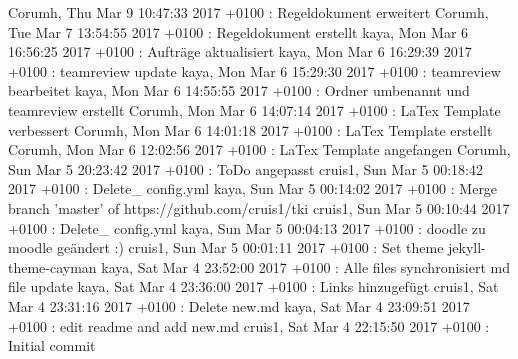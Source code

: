 Corumh, Thu Mar 9 10:47:33 2017 +0100 : Regeldokument erweitert
Corumh, Tue Mar 7 13:54:55 2017 +0100 : Regeldokument erstellt
kaya, Mon Mar 6 16:56:25 2017 +0100 : Aufträge aktualisiert
kaya, Mon Mar 6 16:29:39 2017 +0100 : teamreview update
kaya, Mon Mar 6 15:29:30 2017 +0100 : teamreview bearbeitet
kaya, Mon Mar 6 14:55:55 2017 +0100 : Ordner umbenannt und teamreview erstellt
Corumh, Mon Mar 6 14:07:14 2017 +0100 : LaTex Template verbessert
Corumh, Mon Mar 6 14:01:18 2017 +0100 : LaTex Template erstellt
Corumh, Mon Mar 6 12:02:56 2017 +0100 : LaTex Template angefangen
Corumh, Sun Mar 5 20:23:42 2017 +0100 : ToDo angepasst
cruis1, Sun Mar 5 00:18:42 2017 +0100 : Delete\_ config.yml
kaya, Sun Mar 5 00:14:02 2017 +0100 : Merge branch 'master' of https://github.com/cruis1/tki
cruis1, Sun Mar 5 00:10:44 2017 +0100 : Delete\_ config.yml
kaya, Sun Mar 5 00:04:13 2017 +0100 : doodle zu moodle geändert :)
cruis1, Sun Mar 5 00:01:11 2017 +0100 : Set theme jekyll-theme-cayman
kaya, Sat Mar 4 23:52:00 2017 +0100 : Alle files synchronisiert md file update
kaya, Sat Mar 4 23:36:00 2017 +0100 : Links hinzugefügt
cruis1, Sat Mar 4 23:31:16 2017 +0100 : Delete new.md
kaya, Sat Mar 4 23:09:51 2017 +0100 : edit readme and add new.md
cruis1, Sat Mar 4 22:15:50 2017 +0100 : Initial commit


